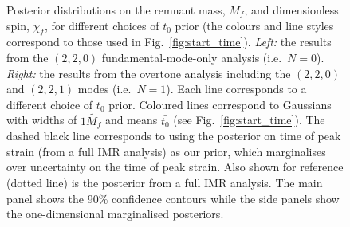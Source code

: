 \begin{figure}[t]
    \captionsetup[subfigure]{labelformat=empty}
    \centering
    \;
    \;
    \caption[Posterior distributions on GW150914's remnant mass and dimensionless spin for different choices of $t_0$ prior]{  
    Posterior distributions on the remnant mass, $M_f$, and dimensionless spin, $\chi_f$, for different choices of $t_0$ prior (the colours and line styles correspond to those used in Fig.~\ref{fig:start_time}). 
    \emph{Left:} the results from the $(2,2,0)$ fundamental-mode-only analysis (i.e.\ $N=0$).
    \emph{Right:} the results from the overtone analysis including the $(2,2,0)$ and $(2,2,1)$ modes (i.e.\ $N=1$).
    Each line corresponds to a different choice of $t_0$ prior. 
    Coloured lines correspond to Gaussians with widths of $1 \tilde{M_f}$ and means $\bar{t_0}$ (see Fig.~\ref{fig:start_time}).
    The dashed black line corresponds to using the posterior on time of peak strain (from a full IMR analysis) as our prior, which marginalises over uncertainty on the time of peak strain.
    Also shown for reference (dotted line) is the posterior from a full IMR analysis. 
    The main panel shows the 90\% confidence contours while the side panels show the one-dimensional marginalised posteriors.
    }
    \label{fig:mass_spin_post}
\end{figure}

